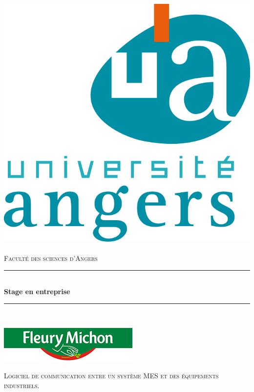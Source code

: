 \documentclass[a4paper,12pt]{extarticle}
\newcommand{\HRule}{\rule{\linewidth}{0.5mm}}
\begin{document}
	\begin{titlepage}
		\begin{sffamily}
		\begin{center}
		
		\includegraphics[scale=0.5]{Img/logo/logo_iutangers}~\\[1.5cm]
		
		\textsc{\LARGE Faculté des sciences d'Angers}\\[1.5cm]
		
		\HRule \\[0.4cm]
		{ \huge \bfseries Stage en entreprise}{\bfseries  \\[0.4cm]}
		\HRule \\[1.5cm]
		
		\begin{center}
			\includegraphics[scale=1]{Img/logo/logo_fleurymichon}
		\end{center}
		
		\textsc{\LARGE Logiciel de communication entre un système MES et des équipements industriels.}\\[1.5cm] 
		

\end{center}
\end{sffamily}
\end{titlepage}
\end{document}
